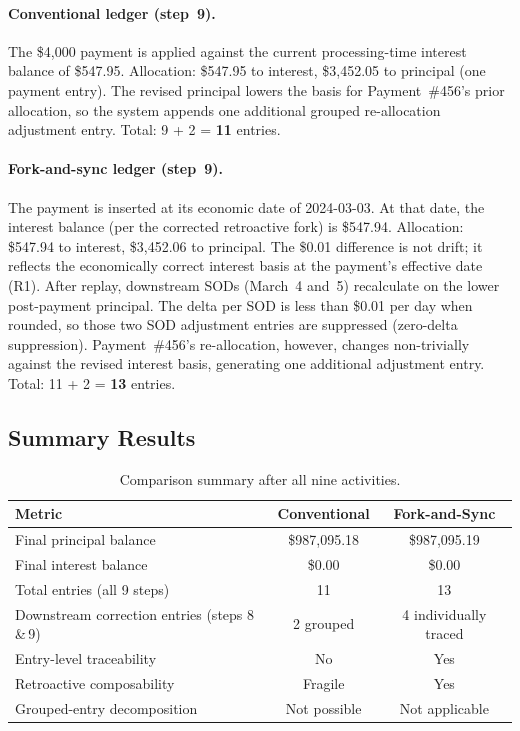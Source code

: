\documentclass[11pt,letterpaper]{article}
\begin{document}
\paragraph{Conventional ledger (step~9).}
The \$4,000 payment is applied against the current processing-time
interest balance of \$547.95. Allocation: \$547.95 to interest,
\$3,452.05 to principal (one payment entry). The revised principal
lowers the basis for Payment~\#456's prior allocation, so the system
appends one additional grouped re-allocation adjustment entry.
Total: 9 + 2 = \textbf{11} entries.

\paragraph{Fork-and-sync ledger (step~9).}
The payment is inserted at its economic date of 2024-03-03. At that
date, the interest balance (per the corrected retroactive fork) is
\$547.94. Allocation: \$547.94 to interest, \$3,452.06 to principal.
The \$0.01 difference is not drift; it reflects the economically
correct interest basis at the payment's effective date (R1). After
replay, downstream SODs (March~4 and~5) recalculate on the lower
post-payment principal. The delta per SOD is less than \$0.01 per day
when rounded, so those two SOD adjustment entries are suppressed
(zero-delta suppression). Payment~\#456's re-allocation, however,
changes non-trivially against the revised interest basis, generating
one additional adjustment entry. Total: 11 + 2 = \textbf{13} entries.

\subsection{Summary Results}

\begin{table}[h!]
\centering
\caption{Comparison summary after all nine activities.}
\label{tab:summary}
\begin{tabularx}{\linewidth}{Xcc}
  \toprule
  \textbf{Metric} & \textbf{Conventional} & \textbf{Fork-and-Sync} \\
  \midrule
  Final principal balance     & \$987,095.18 & \$987,095.19 \\
  Final interest balance      & \$0.00       & \$0.00 \\
  Total entries (all 9 steps) & 11           & 13 \\
  Downstream correction entries (steps 8\,\&\,9) & 2 grouped  & 4 individually traced \\
  Entry-level traceability    & No           & Yes \\
  Retroactive composability   & Fragile      & Yes \\
  Grouped-entry decomposition & Not possible & Not applicable \\
  \bottomrule
\end{tabularx}
\end{table}
\end{document}
